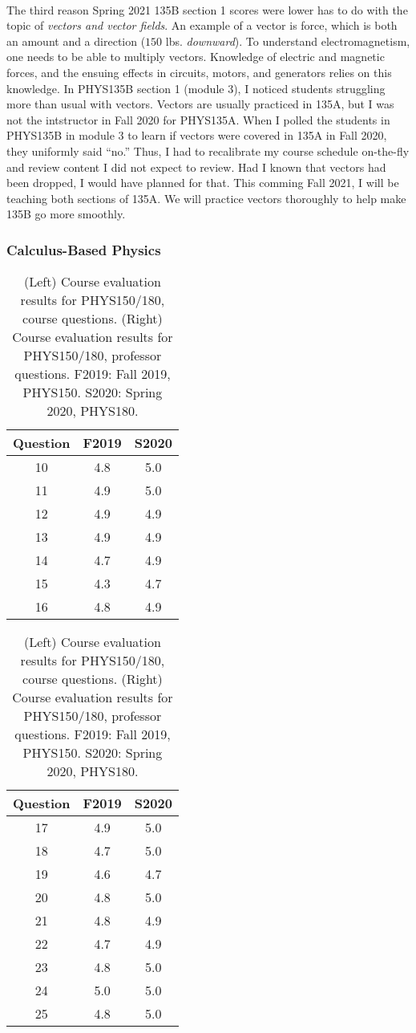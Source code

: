 \documentclass[../../main.tex]{subfiles}
\begin{document}
\\
\vspace{0.25cm}
The third reason Spring 2021 135B section 1 scores were lower has to do with the topic of \textit{vectors and vector fields}.  An example of a vector is force, which is both an amount and a direction ($150$ lbs. \textit{downward}).  To understand electromagnetism, one needs to be able to multiply vectors.  Knowledge of electric and magnetic forces, and the ensuing effects in circuits, motors, and generators relies on this knowledge.  In PHYS135B section 1 (module 3), I noticed students struggling more than usual with vectors.  Vectors are usually practiced in 135A, but I was not the intstructor in Fall 2020 for PHYS135A.  When I polled the students in PHYS135B in module 3 to learn if vectors were covered in 135A in Fall 2020, they uniformly said ``no.''  Thus, I had to recalibrate my course schedule on-the-fly and review content I did not expect to review.  Had I known that vectors had been dropped, I would have planned for that.  This comming Fall 2021, I will be teaching both sections of 135A.  We will practice vectors thoroughly to help make 135B go more smoothly.

\subsubsection{Calculus-Based Physics}

\begin{table}
\footnotesize
\centering
\begin{tabular}{| c | c | c |}
\hline
\hline
Question & F2019 & S2020 \\ \hline
10 & 4.8 & 5.0 \\ \hline
11 & 4.9 & 5.0 \\ \hline
12 & 4.9 & 4.9 \\ \hline
13 & 4.9 & 4.9 \\ \hline
14 & 4.7 & 4.9 \\ \hline
15 & 4.3 & 4.7 \\ \hline
16 & 4.8 & 4.9 \\ \hline
\hline
\end{tabular}
\begin{tabular}{| c | c | c |}
\hline
\hline
Question & F2019 & S2020 \\ \hline
17 & 4.9 & 5.0 \\ \hline
18 & 4.7 & 5.0 \\ \hline
19 & 4.6 & 4.7 \\ \hline
20 & 4.8 & 5.0 \\ \hline
21 & 4.8 & 4.9 \\ \hline
22 & 4.7 & 4.9 \\ \hline
23 & 4.8 & 5.0 \\ \hline
24 & 5.0 & 5.0 \\ \hline
25 & 4.8 & 5.0 \\ \hline
\hline
\end{tabular}
\caption{\label{tab:eval_150_180} (Left) Course evaluation results for PHYS150/180, course questions.  (Right) Course evaluation results for PHYS150/180, professor questions.  F2019: Fall 2019, PHYS150.  S2020: Spring 2020, PHYS180.}
\end{table}
\end{document}
